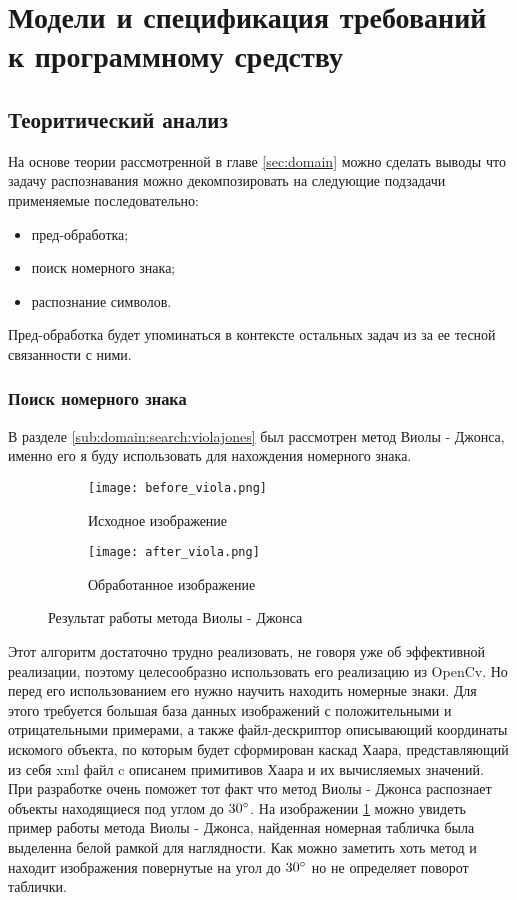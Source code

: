 \section{Модели и спецификация требований к программному средству}
\label{sec:funcreq}

\subsection{Теоритический анализ}
\label{sec:funcreq:teoretical_anolisys}

На основе теории рассмотренной в главе \ref{sec:domain} можно сделать выводы что задачу распознавания можно декомпозировать на следующие подзадачи применяемые последовательно:
\begin{itemize}
	\item пред-обработка;
	\item поиск номерного знака;
	\item распознание символов.
\end{itemize} 

Пред-обработка будет упоминаться в контексте остальных задач из за ее тесной связанности с ними.

\subsubsection{Поиск номерного знака}
\label{seq:funcreq:analisys}

В разделе \ref{sub:domain:search:violajones} был рассмотрен метод Виолы - Джонса, именно его я буду использовать для нахождения номерного знака. 
\begin{figure}[ht]
\centering
  \begin{subfigure}[b]{0.48\textwidth} 
    \centering
    \texttt{[image: before\_viola.png]}  
    \caption{Исходное изображение}
  \end{subfigure}
  \begin{subfigure}[b]{0.48\textwidth} 
    \centering
    \texttt{[image: after\_viola.png]}  
    \caption{Обработанное изображение}
  \end{subfigure}
  \caption{Результат работы метода Виолы - Джонса}
  \label{fig:funcreq:analisys:viola}
\end{figure}
Этот алгоритм достаточно трудно реализовать, не говоря уже об эффективной реализации, поэтому целесообразно использовать его реализацию из OpenCv. Но перед его использованием его нужно научить находить номерные знаки. Для этого требуется большая база данных изображений с положительными и отрицательными примерами, а также файл-дескриптор описывающий координаты искомого объекта, по которым будет сформирован каскад Хаара, представляющий из себя xml файл c описанем примитивов Хаара и их вычисляемых значений. При разработке очень поможет тот факт что метод Виолы - Джонса распознает объекты находящиеся под углом до $30\degree$. На изображении \ref{fig:funcreq:analisys:viola} можно увидеть пример работы метода Виолы - Джонса, найденная номерная табличка была выделенна белой рамкой для наглядности. Как можно заметить хоть метод и находит изображения повернутые на угол до $30\degree$ но не определяет поворот таблички. 

